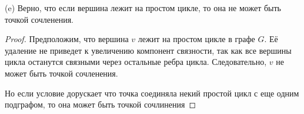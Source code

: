 \begin{proposition}
(e) Верно, что если вершина лежит на простом цикле, то она не может быть точкой сочленения.
\end{proposition}

\begin{proof}
Предположим, что вершина $v$ лежит на простом цикле в графе $G$.
Её удаление не приведет к увеличению компонент связности, так как все вершины цикла останутся связными через остальные ребра цикла. 
Следовательно, $v$ не может быть точкой сочленения.

Но если условие дорускает что точка соединяла некий простой цикл с еще одним подграфом, то она может быть точкой сочлинения
\end{proof}


